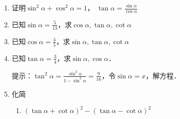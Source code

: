 \begin{ex}
\begin{enumerate}
    \item 证明$\sin^2\alpha+\cos^2\alpha=1$， $\tan\alpha=\frac{\sin\alpha}{\cos\alpha}$
    \item 已知$\sin\alpha=\frac{5}{13}$，求$\cos\alpha, \tan\alpha, \cot\alpha$
    \item 已知$\cos\alpha=\frac{4}{5}$，求$\sin\alpha, \tan\alpha, \cot\alpha$
    \item 已知$\tan\alpha=\frac{3}{4}$，求$\sin\alpha,\cos\alpha$．
    
提示：$\tan^2\alpha =\frac{\sin^2\alpha}{1-\sin^2\alpha}=\frac{9}{16}$，令$\sin \alpha =x$，解方程．

\item 化简

\begin{enumerate}
    \item $(\tan\alpha+\cot\alpha)^2-(\tan\alpha-\cot\alpha)^2$
\end{enumerate}

\end{enumerate}
\end{ex}

